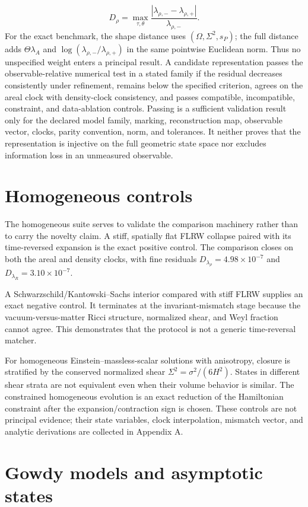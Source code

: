 \documentclass{iopjournal}
\begin{document}
\[
D_\rho=\max_{\tau,\theta}
\frac{|\lambda_{\rho,-}-\lambda_{\rho,+}|}{\lambda_{\rho,-}}.
\]
For the exact benchmark, the shape distance uses $(\Omega,\Sigma^2,s_P)$; the full distance adds $\Theta\lambda_A$ and $\log(\lambda_{\rho,-}/\lambda_{\rho,+})$ in the same pointwise Euclidean norm. Thus no unspecified weight enters a principal result. A candidate representation passes the observable-relative numerical test in a stated family if the residual decreases consistently under refinement, remains below the specified criterion, agrees on the areal clock with density-clock consistency, and passes compatible, incompatible, constraint, and data-ablation controls. Passing is a sufficient validation result only for the declared model family, marking, reconstruction map, observable vector, clocks, parity convention, norm, and tolerances. It neither proves that the representation is injective on the full geometric state space nor excludes information loss in an unmeasured observable.

\section{Homogeneous controls}
The homogeneous suite serves to validate the comparison machinery rather than to carry the novelty claim. A stiff, spatially flat FLRW collapse paired with its time-reversed expansion is the exact positive control. The comparison closes on both the areal and density clocks, with fine residuals $D_{\lambda_\rho}=4.98\times10^{-7}$ and $D_{\lambda_R}=3.10\times10^{-7}$.

A Schwarzschild/Kantowski--Sachs interior compared with stiff FLRW supplies an exact negative control. It terminates at the invariant-mismatch stage because the vacuum-versus-matter Ricci structure, normalized shear, and Weyl fraction cannot agree. This demonstrates that the protocol is not a generic time-reversal matcher.

For homogeneous Einstein--massless-scalar solutions with anisotropy, closure is stratified by the conserved normalized shear $\Sigma^2=\sigma^2/(6H^2)$. States in different shear strata are not equivalent even when their volume behavior is similar. The constrained homogeneous evolution is an exact reduction of the Hamiltonian constraint after the expansion/contraction sign is chosen. These controls are not principal evidence; their state variables, clock interpolation, mismatch vector, and analytic derivations are collected in Appendix A.

\section{Gowdy models and asymptotic states}
\end{document}
